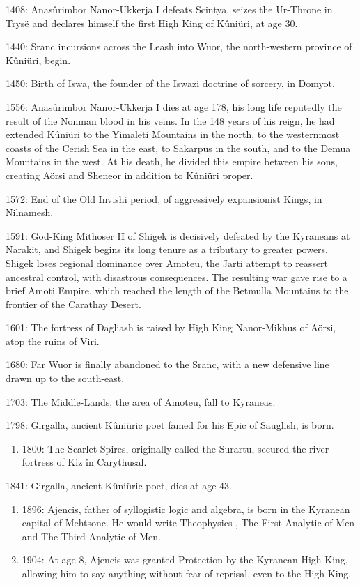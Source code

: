 \documentclass[]{book}
\providecommand{\tightlist}{%
  \setlength{\itemsep}{0pt}\setlength{\parskip}{0pt}}
\begin{document}
1408: Anasûrimbor Nanor-Ukkerja I defeats Scintya, seizes the Ur-Throne in Trysë
and declares himself the first High King of Kûniüri, at age 30.

1440: Sranc incursions across the Leash into Wuor, the north-western province of
Kûniüri, begin.

1450: Birth of Iswa, the founder of the Iswazi doctrine of sorcery, in Domyot.

1556: Anasûrimbor Nanor-Ukkerja I dies at age 178, his long life reputedly the result
of the Nonman blood in his veins. In the 148 years of his reign, he had
extended Kûniüri to the Yimaleti Mountains in the north, to the westernmost
coasts of the Cerish Sea in the east, to Sakarpus in the south, and to the Demua
Mountains in the west. At his death, he divided this empire between his sons,
creating Aörsi and Sheneor in addition to Kûniüri proper.

1572: End of the Old Invishi period, of aggressively expansionist Kings, in Nilnamesh.

1591: God-King Mithoser II of Shigek is decisively defeated by the Kyraneans at Narakit, and Shigek begins its long tenure as a tributary to greater powers. Shigek loses regional dominance over Amoteu, the Jarti attempt to reassert ancestral control, with disastrous consequences. The resulting war gave rise to a brief Amoti Empire, which reached the length of the Betmulla Mountains to the frontier of the Carathay Desert.

1601: The fortress of Dagliash is raised by High King Nanor-Mikhus of Aörsi, atop the
ruins of Viri.

1680: Far Wuor is finally abandoned to the Sranc, with a new defensive line drawn up
to the south-east.

1703: The Middle-Lands, the area of Amoteu, fall to Kyraneas.

1798: Girgalla, ancient Kûniüric poet famed for his Epic of Sauglish, is born.

\begin{enumerate}
\def\labelenumi{\alph{enumi}.}
\setcounter{enumi}{2}
\tightlist
\item
  1800: The Scarlet Spires, originally called the Surartu, secured the river fortress
  of Kiz in Carythusal.
\end{enumerate}

1841: Girgalla, ancient Kûniüric poet, dies at age 43.

\begin{enumerate}
\def\labelenumi{\alph{enumi}.}
\setcounter{enumi}{2}
\item
  1896: Ajencis, father of syllogistic logic and algebra, is born in the Kyranean
  capital of Mehtsonc. He would write Theophysics , The First Analytic of
  Men and The Third Analytic of Men.
\item
  1904: At age 8, Ajencis was granted Protection by the Kyranean High King, allowing him to say anything without fear of reprisal, even to the High King.
\end{enumerate}
\end{document}
